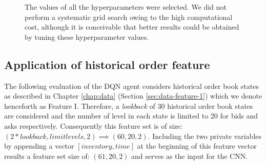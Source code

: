 \begin{figure}[H]
    \centering
    \caption{The values of all the hyperparameters were selected. We did not perform a systematic grid search owing to the high computational cost, although it is conceivable that better results could be obtained by tuning these hyperparameter values.}
    \label{fig:eval-dqn-hyperparameters}
\end{figure}

\subsection{Application of historical order feature}

The following evaluation of the DQN agent considers historical order book states as described in Chapter \ref{chap:data} (Section \ref{sec:data-feature-1}) which we denote henceforth as Feature I.
Therefore, a \textit{lookback} of 30 historical order book states are considered and the number of level in each state is limited to 20 for bids and asks respectively.
Consequently this feature set is of size: $(2*lookback, limit levels, 2) \implies (60, 20, 2)$.
Including the two private variables by appending a vector $[inventory, time]$ at the beginning of this feature vector results a feature set size of: $(61, 20, 2)$ and serves as the input for the CNN.

